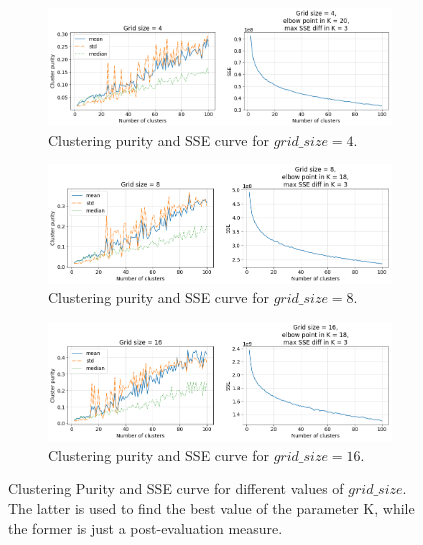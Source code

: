 \documentclass[12pt, twoside, a4paper]{report}
\begin{document}
\newpage


\begin{figure}[h]

\begin{subfigure}[b]{\linewidth}
\includegraphics[width=\linewidth]{images/purity/4by4.png} 
\caption{Clustering purity and SSE curve for $grid\_size = 4$.}
\label{subfig:purity-4}
\end{subfigure}

\begin{subfigure}[b]{\linewidth}
\includegraphics[width=\linewidth]{images/purity/8by8.png} 
\caption{Clustering purity and SSE curve for $grid\_size = 8$.}
\label{subfig:purity-8}
\end{subfigure}

\begin{subfigure}[b]{\linewidth}
\includegraphics[width=\linewidth]{images/purity/16by16.png} 
\caption{Clustering purity and SSE curve for $grid\_size = 16$.}
\label{subfig:purity-16}
\end{subfigure}
\caption{Clustering Purity and SSE curve for different values of $grid\_size$. The latter is used to find the best value of the parameter K, while the former is just a post-evaluation measure.}
\end{figure}
\end{document}

